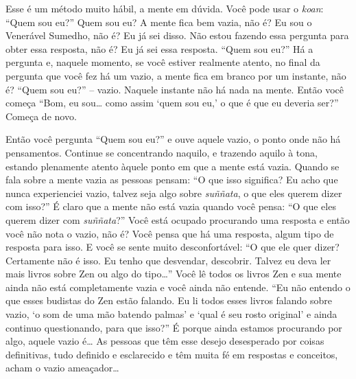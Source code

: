 Esse é um método muito hábil, a mente em dúvida. Você pode usar o
\emph{koan}: “Quem sou eu?” Quem sou eu? A mente fica bem vazia, não
é? Eu sou o Venerável Sumedho, não é? Eu já sei disso. Não estou
fazendo essa pergunta para obter essa resposta, não é? Eu já sei essa
resposta. “Quem sou eu?” Há a pergunta e, naquele momento, se você
estiver realmente atento, no final da pergunta que você fez há um
vazio, a mente fica em branco por um instante, não é? “Quem sou eu?” –
vazio. Naquele instante não há nada na mente. Então você começa “Bom,
eu sou\ldots{} como assim ‘quem sou eu,’ o que é que eu deveria ser?” Começa
de novo.

Então você pergunta “Quem sou eu?” e ouve aquele vazio, o ponto onde
não há pensamentos. Continue se concentrando naquilo, e trazendo aquilo
à tona, estando plenamente atento àquele ponto em que a mente está
vazia. Quando se fala sobre a mente vazia as pessoas pensam: “O que
isso significa? Eu acho que nunca experienciei vazio, talvez seja algo
sobre \emph{suññata}, o que eles querem dizer com isso?” É claro que
a mente não está vazia quando você pensa: “O que eles querem dizer com
\emph{suññata}?” Você está ocupado procurando uma resposta e então
você não nota o vazio, não é? Você pensa que há uma resposta, algum
tipo de resposta para isso. E você se sente muito desconfortável: “O
que ele quer dizer? Certamente não é isso. Eu tenho que desvendar,
descobrir. Talvez eu deva ler mais livros sobre Zen ou algo do tipo\ldots{}”
Você lê todos os livros Zen e sua mente ainda não está completamente
vazia e você ainda não entende. “Eu não entendo o que esses budistas do
Zen estão falando. Eu li todos esses livros falando sobre vazio, ‘o som
de uma mão batendo palmas’ e ‘qual é seu rosto original’ e ainda
continuo questionando, para que isso?” É porque ainda estamos
procurando por algo, aquele vazio é\ldots{} As pessoas que têm esse desejo
desesperado por coisas definitivas, tudo definido e esclarecido e têm
muita fé em respostas e conceitos, acham o vazio ameaçador\ldots{}

